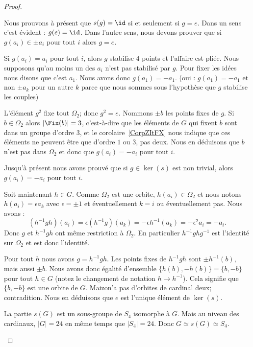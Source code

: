\begin{proof}
\begin{subproof}
\begin{subproof}
			Nous prouvons à présent que \( s(g)=\id\) si et seulement si \( g=e\). Dans un sens c'est évident : \( g(e)=\id\). Dans l'autre sens, nous devons prouver que si \( g(a_i)\in \pm a_i\) pour tout \( i\) alors \( g=e\).

			Si \( g(a_i)=a_i\) pour tout \( i\), alors \( g\) stabilise \( 4\) points et l'affaire est pliée. Nous supposons qu'au moins un des \( a_i\) n'est pas stabilisé par \( g\). Pour fixer les idées nous disons que c'est \( a_1\). Nous avons donc \( g(a_1)=-a_1\). (oui : \( g(a_1)=-a_1\) et non \( \pm a_k\) pour un autre \( k\) parce que nous sommes sous l'hypothèse que \( g\) stabilise les couples)

			L'élément \( g^2\) fixe tout \( \Omega_2\); donc \( g^2=e\). Nommons \( \pm b\) les points fixes de \( g\). Si \( b\in \Omega_2\) alors \( | \Fix(b) |=3\), c'est-à-dire que les éléments de \( G\) qui fixent \( b\) sont dans un groupe d'ordre \( 3\), et le corolaire~\ref{CorpZItFX} nous indique que ces éléments ne peuvent être que d'ordre \( 1\) ou \( 3\), pas deux. Nous en déduisons que \( b\) n'est pas dans \( \Omega_2\) et donc que \( g(a_i)=-a_i\) pour tout \( i\).

			Jusqu'à présent nous avons prouvé que si \( g\in \ker(s)\) est non trivial,  alors \( g(a_i)=-a_i\) pour tout \( i\).

			Soit maintenant \( h\in G\). Comme \( \Omega_2\) est une orbite, \( h(a_i)\in \Omega_2\) et nous notons \( h(a_i)=\epsilon a_k\) avec \( \epsilon=\pm 1\) et éventuellement \( k=i\) ou éventuellement pas. Nous avons :
			\begin{equation}
				(h^{-1}gh)(a_i)=\epsilon (h^{-1} g)(a_k)=-\epsilon h^{-1}(a_k)=-\epsilon^2 a_i=-a_i.
			\end{equation}
			Donc \( g\) et \( h^{-1} g h\) ont même restriction à \( \Omega_2\). En particulier \( h^{-1} ghg^{-1}\) est l'identité sur \( \Omega_2\) et est donc l'identité.

			Pour tout \( h\) nous avons \( g=h^{-1} gh\). Les points fixes de \( h^{-1}g h\) sont \( \pm h^{-1}(b)\), mais aussi \( \pm b\). Nous avons donc égalité d'ensemble \( \{ h(b),-h(b) \}=\{ b,-b \}\) pour tout \( h\in G\) (notez le changement de notation \( h\to h^{-1}\)). Cela signifie que \( \{ b,-b \}\) est une orbite de \( G\). Maizon'a pas d'orbites de cardinal deux; contradition. Nous en déduisons que \( e\) est l'unique élément de \( \ker(s)\).

			\spitem[Conclusion]
			La partie \( s(G)\) est un sous-groupe de \( S_4\) isomorphe à \( G\). Mais au niveau des cardinaux, \( | G |=24\) en même temps que \( | S_4 |=24\). Donc \( G\simeq s(G)\simeq S_4\).
		\end{subproof}
	\end{subproof}


\end{proof}
